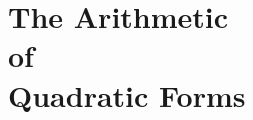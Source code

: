 \documentclass[
  10pt,
  letterpaper,
  twoside,
  openright,
]{book}
\begin{document}
\part[
  shorttitle={The Arithmetic of Quadratic Forms}
]{%
  The Arithmetic\\
  of\\
  Quadratic Forms%
}




% 

% 

% 

\end{document}
